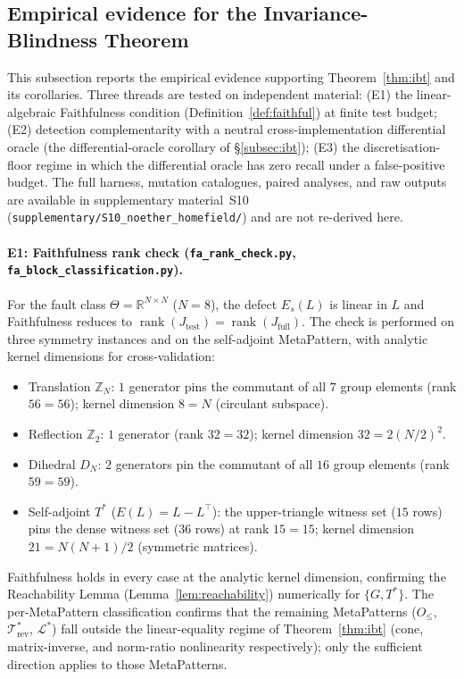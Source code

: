 \documentclass[acmsmall,screen,review]{acmart}
\begin{document}
\subsection{Empirical evidence for the Invariance-Blindness Theorem}
\label{subsec:ibt-empirical}

This subsection reports the empirical evidence supporting Theorem~\ref{thm:ibt} and its corollaries. Three threads are tested on independent material: (E1) the linear-algebraic Faithfulness condition (Definition~\ref{def:faithful}) at finite test budget; (E2) detection complementarity with a neutral cross-implementation differential oracle (the differential-oracle corollary of \S\ref{subsec:ibt}); (E3) the discretisation-floor regime in which the differential oracle has zero recall under a false-positive budget. The full harness, mutation catalogues, paired analyses, and raw outputs are available in supplementary material~S10 (\texttt{supplementary/S10\_noether\_homefield/}) and are not re-derived here.

\paragraph{E1: Faithfulness rank check (\texttt{fa\_rank\_check.py}, \texttt{fa\_block\_classification.py}).}
For the fault class $\Theta = \mathbb{R}^{N \times N}$ ($N = 8$), the defect $E_s(L)$ is linear in $L$ and Faithfulness reduces to $\operatorname{rank}(J_{\mathrm{test}}) = \operatorname{rank}(J_{\mathrm{full}})$. The check is performed on three symmetry instances and on the self-adjoint MetaPattern, with analytic kernel dimensions for cross-validation:
\begin{itemize}[leftmargin=*,nosep]
  \item Translation $\mathbb{Z}_N$: $1$ generator pins the commutant of all $7$ group elements (rank $56=56$); kernel dimension $8 = N$ (circulant subspace).
  \item Reflection $\mathbb{Z}_2$: $1$ generator (rank $32 = 32$); kernel dimension $32 = 2(N/2)^{2}$.
  \item Dihedral $D_N$: $2$ generators pin the commutant of all $16$ group elements (rank $59 = 59$).
  \item Self-adjoint $T^{*}$ ($E(L) = L - L^{\top}$): the upper-triangle witness set ($15$ rows) pins the dense witness set ($36$ rows) at rank $15 = 15$; kernel dimension $21 = N(N+1)/2$ (symmetric matrices).
\end{itemize}
Faithfulness holds in every case at the analytic kernel dimension, confirming the Reachability Lemma (Lemma~\ref{lem:reachability}) numerically for $\{G, T^{*}\}$. The per-MetaPattern classification confirms that the remaining MetaPatterns ($O_{\le}$, $\mathcal{T}^{*}_{\mathrm{rev}}$, $\mathcal{L}^{*}$) fall outside the linear-equality regime of Theorem~\ref{thm:ibt} (cone, matrix-inverse, and norm-ratio nonlinearity respectively); only the sufficient direction applies to those MetaPatterns.
\end{document}
